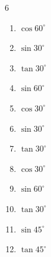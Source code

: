 \begin{multicols}{6}
\begin{enumerate}
  \item $\displaystyle \cos{60^\circ}$


  \item $\displaystyle \sin{30^\circ}$


  \item $\displaystyle \tan{30^\circ}$


  \item $\displaystyle \sin{60^\circ}$


  \item $\displaystyle \cos{30^\circ}$


  \item $\displaystyle \sin{30^\circ}$


  \item $\displaystyle \tan{30^\circ}$


  \item $\displaystyle \cos{30^\circ}$


\columnbreak %

  \item $\displaystyle \sin{60^\circ}$


  \item $\displaystyle \tan{30^\circ}$


  \item $\displaystyle \sin{45^\circ}$


  \item $\displaystyle \tan{45^\circ}$

        \phantom{$\displaystyle =1$}


\end{enumerate}
\end{multicols}

